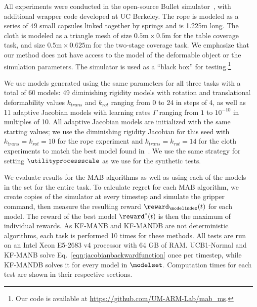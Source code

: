 All experiments were conducted in the open-source Bullet simulator~\cite{Coumans2010}, with additional wrapper code developed at UC Berkeley. The rope is modeled as a series of 49 small capsules linked together by springs and is 1.225m long. The cloth is modeled as a triangle mesh of size $0.5\text{m} \times 0.5\text{m}$ for the table coverage task, and size $0.5\text{m} \times 0.625\text{m}$ for the two-stage coverage task. We emphasize that our method does not have access to the model of the deformable object or the simulation parameters. The simulator is used as a ``black box'' for testing.\footnote{Our code is available at \url{https://github.com/UM-ARM-Lab/mab_ms}.}

We use models generated using the same parameters for all three tasks with a total of 60 models: 49 diminishing rigidity models with rotation and translational deformability values $k_{trans}$ and $k_{rot}$ ranging from 0 to 24 in steps of 4, as well as 11 adaptive Jacobian models with learning rates $\Gamma$ ranging from $1$ to $10^{-10}$ in multiples of 10. All adaptive Jacobian models are initialized with the same starting values; we use the diminishing rigidity Jacobian for this seed with $k_{trans}=k_{rot}=10$ for the rope experiment and $k_{trans}=k_{rot}=14$ for the cloth experiments to match the best model found in~\cite{Berenson2013}. We use the same strategy for setting $\utilityprocessscale$ as we use for the synthetic tests. 

We evaluate results for the MAB algorithms as well as using each of the models in the set for the entire task. To calculate regret for each MAB algorithm, we create copies of the simulator at every timestep and simulate the gripper command, then measure the resulting reward $\reward_\modelindex(t)$ for each model. The reward of the best model $\reward^*(t)$ is then the maximum of individual rewards. As KF-MANB and KF-MANDB are not deterministic algorithms, each task is performed 10 times for these methods. All tests are run on an Intel Xeon E5-2683 v4 processor with 64 GB of RAM. UCB1-Normal and KF-MANB solve Eq.~\eqref{eqn:jacobianbackwardfunction} once per timestep, while KF-MANDB solves it for every model in $\modelset$. Computation times for each test are shown in their respective sections.


